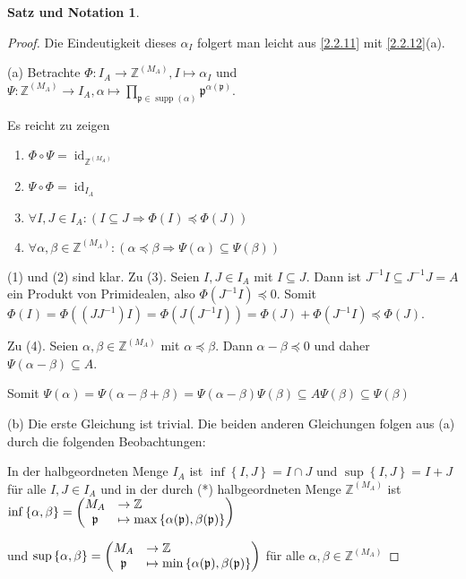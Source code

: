 \documentclass[
twoside=semi,
fontsize=12,
DIV=12, 
cleardoublepage=current,
leqno,
headings=optiontoheadandtoc, 
toc=idx
]{scrbook}
\newcommand{\Z}{\mathbb{Z}}
\newcommand{\set}[1]{\left\{ #1 \right\}}
\DeclareMathOperator{\supp}{supp}
\DeclareMathOperator{\id}{id}
\theoremstyle{definition}
\newtheorem{satz-not}[definition]{Satz und Notation}
\begin{document}
\begin{satz-not}
\begin{proof}
 			Die Eindeutigkeit dieses $\alpha_I$ folgert man leicht aus \ref{2.2.11} mit \ref{2.2.12}(a).
 			
 			(a) Betrachte $\Phi: I_A \to \Z^{(M_A)}, I \mapsto \alpha_I$ und $\Psi: \Z^{(M_A)} \to I_A, \alpha \mapsto \prod_{\mathfrak{p} \in \supp(\alpha)} \mathfrak{p}^{\alpha(\mathfrak{p})}$.
 			
 			Es reicht zu zeigen 
 			\begin{enumerate}[(1)]
 				\item $\Phi \circ \Psi = \id_{\Z^{(M_A)}}$
 				\item $\Psi \circ \Phi = \id_{I_A}$
 				\item $\forall I, J \in I_A: (I \subseteq J \Rightarrow \Phi(I) \preceq \Phi(J))$
 				\item $\forall \alpha, \beta \in \Z^{(M_A)}: ( \alpha \preceq \beta \Rightarrow \Psi(\alpha) \subseteq \Psi(\beta))$
 			\end{enumerate}
 		
 			(1) und (2) sind klar. Zu (3). Seien $I, J \in I_A$ mit $I \subseteq J$. Dann ist $J^{-1}I \subseteq J^{-1}J = A$ ein Produkt von Primidealen, also $\Phi(J^{-1}I) \preceq 0$. Somit 
 			$\Phi(I) = \Phi((JJ^{-1})I) = \Phi(J(J^{-1}I)) = \Phi(J) + \Phi(J^{-1}I) \preceq \Phi(J)$.
 			
 			Zu (4). Seien $\alpha, \beta \in \Z^{(M_A)}$ mit $\alpha \preceq \beta$. Dann $\alpha - \beta \preceq 0$ und daher $\Psi(\alpha - \beta ) \subseteq A$.
 			
 			Somit $\Psi(\alpha) = \Psi(\alpha-\beta + \beta) = \Psi(\alpha-\beta)\Psi(\beta) \subseteq A\Psi(\beta) \subseteq \Psi(\beta)$
 			
 			(b) Die erste Gleichung ist trivial. Die beiden anderen Gleichungen folgen aus (a) durch die folgenden Beobachtungen:
 			
 			In der halbgeordneten Menge $I_A$ ist $\inf \set{I, J} = I \cap J$ und $\sup \set{I, J} = I + J$ f\"ur alle $I, J \in I_A$ und in der durch (*) halbgeordneten Menge
 			$\Z^{(M_A)}$ ist $\inf \set{\alpha, \beta} = \begin{pmatrix}
 					M_A &\to \Z\hfill\\
 					\mathfrak{p} &\mapsto \max \set{\alpha(\mathfrak{p}), \beta(\mathfrak{p})}
 			\end{pmatrix}$
 		
 			und $\sup \set{\alpha, \beta} = \begin{pmatrix}
 					M_A &\to \Z\hfill\\
 					\mathfrak{p} &\mapsto \min \set{\alpha(\mathfrak{p}), \beta(\mathfrak{p})}
 			\end{pmatrix}$ f\"ur alle $\alpha, \beta \in \Z^{(M_A)}$
 		

\end{proof}
\end{satz-not}
\end{document}

